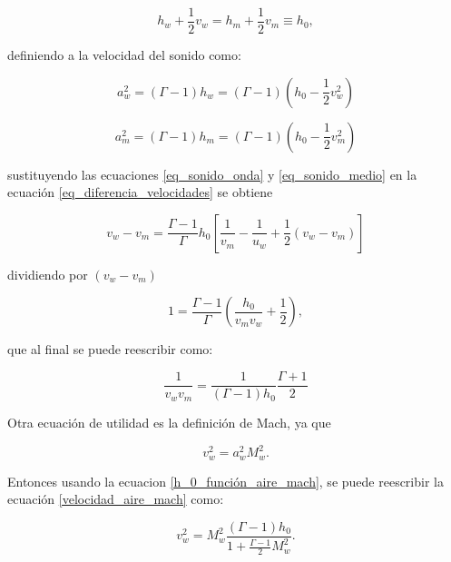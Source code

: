 \documentclass[12pt,a4paper]{book}
\begin{document}
\begin{equation}
  h_w + \frac{1}{2} v_w = h_m + \frac{1}{2} v_m \equiv h_0,
\end{equation}

\noindent definiendo a la velocidad del sonido como:

\begin{equation} \label{eq_sonido_onda}
  a_w^2 = \left( \Gamma-1 \right) h_w = \left( \Gamma-1 \right) \left( h_0 -\frac{1}{2} v_w^2 \right)
\end{equation}

\begin{equation} \label{eq_sonido_medio}
  a_m^2 = \left( \Gamma-1 \right) h_m = \left( \Gamma-1 \right) \left( h_0 -\frac{1}{2} v_m^2 \right)
\end{equation}

\noindent sustituyendo las ecuaciones \ref{eq_sonido_onda} y \ref{eq_sonido_medio} en la ecuación \ref{eq_diferencia_velocidades}
se obtiene

\begin{equation}
  v_w-v_m = \frac{\Gamma - 1}{\Gamma} h_0 \left[ \frac{1}{v_m} - \frac{1}{u_w} + \frac{1}{2} \left( v_w - v_m\right) \right]
\end{equation}

\noindent dividiendo por $ \left( v_w - v_m \right)$

\begin{equation}
  1 = \frac{\Gamma - 1}{\Gamma} \left( \frac{h_0}{v_m v_w} + \frac{1}{2} \right),
\end{equation}

\noindent que al final se puede reescribir como:

\begin{equation} \label{eq_denominador}
  \frac{1}{v_w v_m} = \frac{1}{\left( \Gamma -1\right) h_0} \frac{\Gamma + 1}{2}
\end{equation}

Otra ecuación de utilidad es la definición de Mach, ya que

\begin{equation}\label{velocidad_aire_mach}
  v_w^2 = a_w^2 M_w^2.
\end{equation}

\noindent Entonces usando la ecuacion \ref{h_0_función_aire_mach}, se puede reescribir la ecuación \ref{velocidad_aire_mach}
como:

\begin{equation} \label{eq_numerador}
  v_w^2 = M_w^2 \frac{\left( \Gamma -1 \right) h_0}{1+\frac{\Gamma - 1}{2} M_w^2}.
\end{equation}
\end{document}
